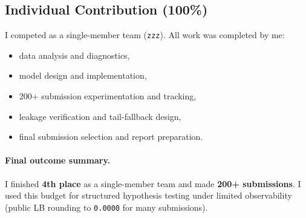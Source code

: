 \subsection{Individual Contribution (100\%)}
I competed as a single-member team (\texttt{zzz}). All work was completed by me:
\begin{itemize}[leftmargin=1.5em]
  \item data analysis and diagnostics,
  \item model design and implementation,
  \item 200+ submission experimentation and tracking,
  \item leakage verification and tail-fallback design,
  \item final submission selection and report preparation.
\end{itemize}

\paragraph{Final outcome summary.}
I finished \textbf{4th place} as a single-member team and made \textbf{200+ submissions}. I used this budget for structured hypothesis testing under limited observability (public LB rounding to \texttt{0.0000} for many submissions).
